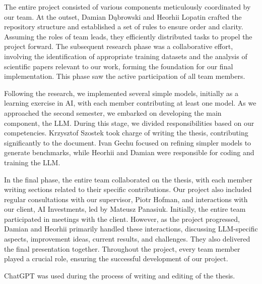 The entire project consisted of various components meticulously coordinated by our team. At the outset, Damian Dąbrowski and Heorhii Lopatin crafted the repository structure and established a set of rules to ensure order and clarity. Assuming the roles of team leads, they efficiently distributed tasks to propel the project forward. The subsequent research phase was a collaborative effort, involving the identification of appropriate training datasets and the analysis of scientific papers relevant to our work, forming the foundation for our final implementation. This phase saw the active participation of all team members.

Following the research, we implemented several simple models, initially as a learning exercise in AI, with each member contributing at least one model. As we approached the second semester, we embarked on developing the main component, the LLM. During this stage, we divided responsibilities based on our competencies. Krzysztof Szostek took charge of writing the thesis, contributing significantly to the document. Ivan Gechu focused on refining simpler models to generate benchmarks, while Heorhii and Damian were responsible for coding and training the LLM.

In the final phase, the entire team collaborated on the thesis, with each member writing sections related to their specific contributions. Our project also included regular consultations with our supervisor, Piotr Hofman, and interactions with our client, AI Investments, led by Mateusz Panasiuk. Initially, the entire team participated in meetings with the client. However, as the project progressed, Damian and Heorhii primarily handled these interactions, discussing LLM-specific aspects, improvement ideas, current results, and challenges. They also delivered the final presentation together. Throughout the project, every team member played a crucial role, ensuring the successful development of our project.

ChatGPT was used during the process of writing and editing of the thesis.
